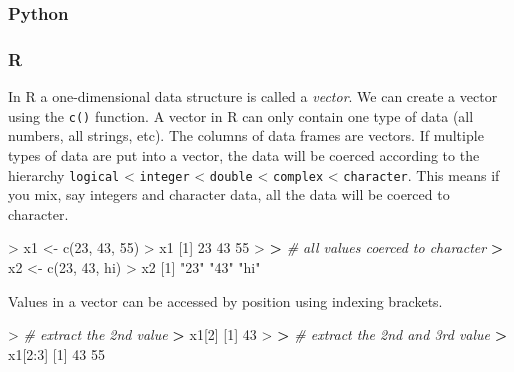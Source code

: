 \documentclass[
]{book}
\newenvironment{Shaded}{\begin{snugshade}}{\end{snugshade}}
\newcommand{\CommentTok}[1]{\textcolor[rgb]{0.56,0.35,0.01}{\textit{#1}}}
\newcommand{\DecValTok}[1]{\textcolor[rgb]{0.00,0.00,0.81}{#1}}
\newcommand{\ErrorTok}[1]{\textcolor[rgb]{0.64,0.00,0.00}{\textbf{#1}}}
\newcommand{\FunctionTok}[1]{\textcolor[rgb]{0.00,0.00,0.00}{#1}}
\newcommand{\NormalTok}[1]{#1}
\newcommand{\OtherTok}[1]{\textcolor[rgb]{0.56,0.35,0.01}{#1}}
\newcommand{\SpecialCharTok}[1]{\textcolor[rgb]{0.00,0.00,0.00}{#1}}
\newcommand{\StringTok}[1]{\textcolor[rgb]{0.31,0.60,0.02}{#1}}
\begin{document}
\hypertarget{python-7}{%
\subsubsection*{Python}\label{python-7}}

\hypertarget{r-7}{%
\subsubsection*{R}\label{r-7}}

In R a one-dimensional data structure is called a \emph{vector}. We can create a vector using the \texttt{c()} function. A vector in R can only contain one type of data (all numbers, all strings, etc). The columns of data frames are vectors. If multiple types of data are put into a vector, the data will be coerced according to the hierarchy \texttt{logical} \textless{} \texttt{integer} \textless{} \texttt{double} \textless{} \texttt{complex} \textless{} \texttt{character}. This means if you mix, say integers and character data, all the data will be coerced to character.

\begin{Shaded}
\begin{Highlighting}[]
\SpecialCharTok{\textgreater{}}\NormalTok{ x1 }\OtherTok{\textless{}{-}} \FunctionTok{c}\NormalTok{(}\DecValTok{23}\NormalTok{, }\DecValTok{43}\NormalTok{, }\DecValTok{55}\NormalTok{)}
\SpecialCharTok{\textgreater{}}\NormalTok{ x1}
\NormalTok{[}\DecValTok{1}\NormalTok{] }\DecValTok{23} \DecValTok{43} \DecValTok{55}
\SpecialCharTok{\textgreater{}} 
\ErrorTok{\textgreater{}} \CommentTok{\# all values coerced to character}
\ErrorTok{\textgreater{}}\NormalTok{ x2 }\OtherTok{\textless{}{-}} \FunctionTok{c}\NormalTok{(}\DecValTok{23}\NormalTok{, }\DecValTok{43}\NormalTok{, }\StringTok{\textquotesingle{}hi\textquotesingle{}}\NormalTok{)}
\SpecialCharTok{\textgreater{}}\NormalTok{ x2}
\NormalTok{[}\DecValTok{1}\NormalTok{] }\StringTok{"23"} \StringTok{"43"} \StringTok{"hi"}
\end{Highlighting}
\end{Shaded}

Values in a vector can be accessed by position using indexing brackets.

\begin{Shaded}
\begin{Highlighting}[]
\SpecialCharTok{\textgreater{}} \CommentTok{\# extract the 2nd value}
\ErrorTok{\textgreater{}}\NormalTok{ x1[}\DecValTok{2}\NormalTok{]}
\NormalTok{[}\DecValTok{1}\NormalTok{] }\DecValTok{43}
\SpecialCharTok{\textgreater{}} 
\ErrorTok{\textgreater{}} \CommentTok{\# extract the 2nd and 3rd value}
\ErrorTok{\textgreater{}}\NormalTok{ x1[}\DecValTok{2}\SpecialCharTok{:}\DecValTok{3}\NormalTok{]}
\NormalTok{[}\DecValTok{1}\NormalTok{] }\DecValTok{43} \DecValTok{55}
\end{Highlighting}
\end{Shaded}
\end{document}
